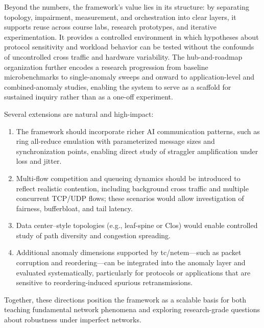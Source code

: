 \documentclass[11pt,a4paper]{article}
\begin{document}
Beyond the numbers, the framework's value lies in its structure: by separating topology, impairment, measurement, and orchestration into clear layers, it supports reuse across course labs, research prototypes, and iterative experimentation. It provides a controlled environment in which hypotheses about protocol sensitivity and workload behavior can be tested without the confounds of uncontrolled cross traffic and hardware variability. The hub-and-roadmap organization further encodes a research progression from baseline microbenchmarks to single-anomaly sweeps and onward to application-level and combined-anomaly studies, enabling the system to serve as a scaffold for sustained inquiry rather than as a one-off experiment.

Several extensions are natural and high-impact:
\begin{enumerate}[nosep]
    \item The framework should incorporate richer AI communication patterns, such as ring all-reduce emulation with parameterized message sizes and synchronization points, enabling direct study of straggler amplification under loss and jitter.
    \item Multi-flow competition and queueing dynamics should be introduced to reflect realistic contention, including background cross traffic and multiple concurrent TCP/UDP flows; these scenarios would allow investigation of fairness, bufferbloat, and tail latency.
    \item Data center–style topologies (e.g., leaf-spine or Clos) would enable controlled study of path diversity and congestion spreading.
    \item Additional anomaly dimensions supported by tc/netem—such as packet corruption and reordering—can be integrated into the anomaly layer and evaluated systematically, particularly for protocols or applications that are sensitive to reordering-induced spurious retransmissions.
\end{enumerate}

Together, these directions position the framework as a scalable basis for both teaching fundamental network phenomena and exploring research-grade questions about robustness under imperfect networks.
\end{document}

